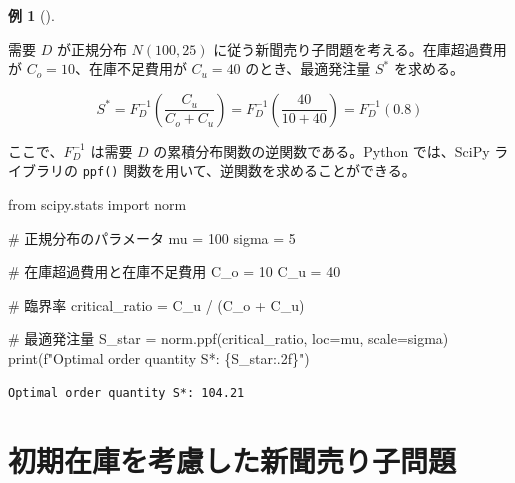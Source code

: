 \documentclass[
  japanese,
  letterpaper,
]{ltjbook}
\newenvironment{Shaded}{\begin{snugshade}}{\end{snugshade}}
\newcommand{\BuiltInTok}[1]{\textcolor[rgb]{0.00,0.23,0.31}{#1}}
\newcommand{\CommentTok}[1]{\textcolor[rgb]{0.37,0.37,0.37}{#1}}
\newcommand{\DecValTok}[1]{\textcolor[rgb]{0.68,0.00,0.00}{#1}}
\newcommand{\ImportTok}[1]{\textcolor[rgb]{0.00,0.46,0.62}{#1}}
\newcommand{\NormalTok}[1]{\textcolor[rgb]{0.00,0.23,0.31}{#1}}
\newcommand{\OperatorTok}[1]{\textcolor[rgb]{0.37,0.37,0.37}{#1}}
\newcommand{\SpecialCharTok}[1]{\textcolor[rgb]{0.37,0.37,0.37}{#1}}
\newcommand{\SpecialStringTok}[1]{\textcolor[rgb]{0.13,0.47,0.30}{#1}}
\theoremstyle{plain}
\theoremstyle{definition}
\newtheorem{example}{例}[chapter]
\theoremstyle{remark}
\begin{document}
\begin{example}[]\protect\hypertarget{exm-newsvendor}{}\label{exm-newsvendor}

需要 \(D\) が正規分布 \(N(100, 25)\)
に従う新聞売り子問題を考える。在庫超過費用が
\(C_o = 10\)、在庫不足費用が \(C_u = 40\) のとき、最適発注量 \(S^*\)
を求める。

\[
S^* = F_D^{-1}\left(\frac{C_u}{C_o + C_u}\right) = F_D^{-1}\left(\frac{40}{10 + 40}\right) = F_D^{-1}\left(0.8\right)
\]

ここで、\(F_D^{-1}\) は需要 \(D\) の累積分布関数の逆関数である。Python
では、SciPy ライブラリの \texttt{ppf()}
関数を用いて、逆関数を求めることができる。

\begin{Shaded}
\begin{Highlighting}[]
\ImportTok{from}\NormalTok{ scipy.stats }\ImportTok{import}\NormalTok{ norm}

\CommentTok{\# 正規分布のパラメータ}
\NormalTok{mu }\OperatorTok{=} \DecValTok{100}
\NormalTok{sigma }\OperatorTok{=} \DecValTok{5}

\CommentTok{\# 在庫超過費用と在庫不足費用}
\NormalTok{C\_o }\OperatorTok{=} \DecValTok{10}
\NormalTok{C\_u }\OperatorTok{=} \DecValTok{40}

\CommentTok{\# 臨界率}
\NormalTok{critical\_ratio }\OperatorTok{=}\NormalTok{ C\_u }\OperatorTok{/}\NormalTok{ (C\_o }\OperatorTok{+}\NormalTok{ C\_u)}

\CommentTok{\# 最適発注量}
\NormalTok{S\_star }\OperatorTok{=}\NormalTok{ norm.ppf(critical\_ratio, loc}\OperatorTok{=}\NormalTok{mu, scale}\OperatorTok{=}\NormalTok{sigma)}
\BuiltInTok{print}\NormalTok{(}\SpecialStringTok{f"Optimal order quantity S*: }\SpecialCharTok{\{}\NormalTok{S\_star}\SpecialCharTok{:.2f\}}\SpecialStringTok{"}\NormalTok{)}
\end{Highlighting}
\end{Shaded}

\begin{verbatim}
Optimal order quantity S*: 104.21
\end{verbatim}

\end{example}

\section{初期在庫を考慮した新聞売り子問題}\label{ux521dux671fux5728ux5eabux3092ux8003ux616eux3057ux305fux65b0ux805eux58f2ux308aux5b50ux554fux984c}
\end{document}
